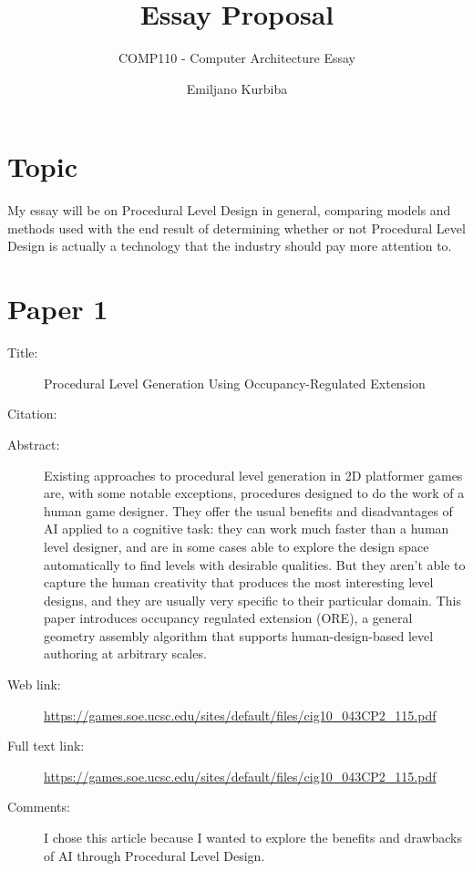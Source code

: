 \documentclass{scrartcl}
\title{Essay Proposal}
\subtitle{COMP110 - Computer Architecture Essay}
\author{Emiljano Kurbiba}
\begin{document}
\maketitle

\section*{Topic}

My essay will be on Procedural Level Design in general, comparing models and methods used with the end result of determining whether or not Procedural Level Design is actually a technology that the industry should pay more attention to.

\section*{Paper 1}
\begin{description}
\item[Title:] Procedural Level Generation Using Occupancy-Regulated Extension
\item[Citation:] \cite{PLDORE}
\item[Abstract:] Existing approaches to procedural level generation
in 2D platformer games are, with some notable exceptions,
procedures designed to do the work of a human game designer.
They offer the usual benefits and disadvantages of AI applied to
a cognitive task: they can work much faster than a human level
designer, and are in some cases able to explore the design space
automatically to find levels with desirable qualities. But they
aren’t able to capture the human creativity that produces the
most interesting level designs, and they are usually very specific
to their particular domain. This paper introduces occupancy regulated
extension (ORE), a general geometry assembly algorithm
that supports human-design-based level authoring at
arbitrary scales.
\item[Web link:] \url{https://games.soe.ucsc.edu/sites/default/files/cig10_043CP2_115.pdf}
\item[Full text link:] \url{https://games.soe.ucsc.edu/sites/default/files/cig10_043CP2_115.pdf}
\item[Comments:] I chose this article because I wanted to explore the benefits and drawbacks of AI through Procedural Level Design. 
\end{description}
\end{document}
